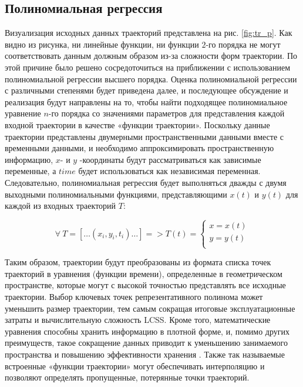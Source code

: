 \subsection{Полиномиальная регрессия}

Визуализация исходных данных траекторий представлена на рис. \ref{fig:tr_p}. Как видно из рисунка, ни линейные функции, ни функции $2$-го порядка не могут соответствовать данным должным образом из-за сложности форм траектории. По этой причине было решено сосредоточиться на приближении с использованием полиномиальной регрессии высшего порядка. Оценка полиномиальной регрессии с различными степенями будет приведена далее, и последующее обсуждение и реализация будут направлены на то, чтобы найти подходящее полиномиальное уравнение $n$-го порядка со значениями параметров для представления каждой входной траектории в качестве «функции траектории». Поскольку данные траектории представлены двумерными пространственными данными вместе с временными данными, и необходимо аппроксимировать пространственную информацию, $x$- и $y$ -координаты будут рассматриваться как зависимые переменные, а $time$ будет использоваться как независимая переменная. Следовательно, полиномиальная регрессия будет выполняться дважды с двумя выходными полиномиальными функциями, представляющими $x(t)$ и $y(t)$ для каждой из входных траекторий $T$:

\begin{equation}\label{eq:regr-func}
	\forall\ T = [\ldots (x_i, y_i, t_i) \ldots] = > T(t) = 
		\begin{cases}
			x = x(t) \\
			y = y(t) \\
		\end{cases}
\end{equation}

Таким образом, траектории будут преобразованы из формата списка точек траекторий в уравнения (функции времени), определенные в геометрическом пространстве, которые могут с высокой точностью представлять все исходные траектории. Выбор ключевых точек репрезентативного полинома может уменьшить размер траектории, тем самым сокращая итоговые эксплуатационные затраты и вычислительную сложность LCSS. Кроме того, математические уравнения способны хранить информацию в плотной форме, и, помимо других преимуществ, такое сокращение данных приводит к уменьшению занимаемого пространства и повышению эффективности хранения \cite{article:behav_form_extr}. Также так называемые встроенные «функции траектории» могут обеспечивать интерполяцию и позволяют определять пропущенные, потерянные точки траекторий.
